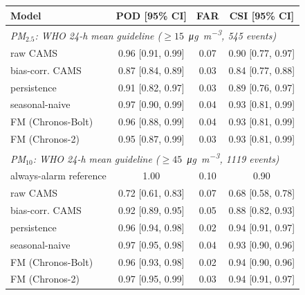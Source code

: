 \documentclass[11pt]{article}
\begin{document}
\begin{table}[htbp]
\begin{tabular}{lccc}\toprule
Model & POD [95\% CI] & FAR & CSI [95\% CI] \\ \midrule
\multicolumn{4}{l}{\textit{PM$_{2.5}$: WHO 24-h mean guideline ($\geq15$~\si{\micro\gram\per\cubic\metre}, 545 events)}} \\
\quad raw CAMS & 0.96 [0.91, 0.99] & 0.07 & 0.90 [0.77, 0.97] \\
\quad bias-corr. CAMS & 0.87 [0.84, 0.89] & 0.03 & 0.84 [0.77, 0.88] \\
\quad persistence & 0.91 [0.82, 0.97] & 0.03 & 0.89 [0.76, 0.97] \\
\quad seasonal-naive & 0.97 [0.90, 0.99] & 0.04 & 0.93 [0.81, 0.99] \\
\quad FM (Chronos-Bolt) & 0.96 [0.88, 0.99] & 0.04 & 0.93 [0.81, 0.99] \\
\quad FM (Chronos-2) & 0.95 [0.87, 0.99] & 0.03 & 0.93 [0.81, 0.99] \\
\multicolumn{4}{l}{\textit{PM$_{10}$: WHO 24-h mean guideline ($\geq45$~\si{\micro\gram\per\cubic\metre}, 1119 events)}} \\
\quad always-alarm reference & 1.00 & 0.10 & 0.90 \\
\quad raw CAMS & 0.72 [0.61, 0.83] & 0.07 & 0.68 [0.58, 0.78] \\
\quad bias-corr. CAMS & 0.92 [0.89, 0.95] & 0.05 & 0.88 [0.82, 0.93] \\
\quad persistence & 0.96 [0.94, 0.98] & 0.02 & 0.94 [0.91, 0.97] \\
\quad seasonal-naive & 0.97 [0.95, 0.98] & 0.04 & 0.93 [0.90, 0.96] \\
\quad FM (Chronos-Bolt) & 0.96 [0.93, 0.98] & 0.02 & 0.94 [0.90, 0.96] \\
\quad FM (Chronos-2) & 0.97 [0.95, 0.99] & 0.03 & 0.94 [0.91, 0.97] \\
\bottomrule\end{tabular}\end{table}
\end{document}
